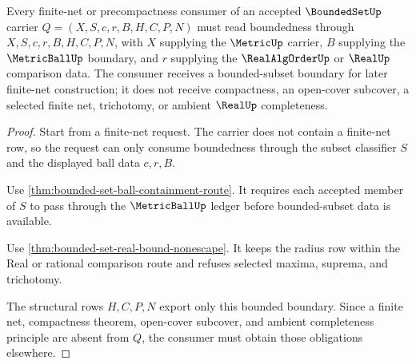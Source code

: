 \begin{theorem}
\label{thm:bounded-set-finite-net-consumer-boundary}
Every finite-net or precompactness consumer of an accepted $\BoundedSetUp$ carrier $Q=(X,S,c,r,B,H,C,P,N)$ must read boundedness through $X,S,c,r,B,H,C,P,N$, with $X$ supplying the $\MetricUp$ carrier, $B$ supplying the $\MetricBallUp$ boundary, and $r$ supplying the $\RealAlgOrderUp$ or $\RealUp$ comparison data. The consumer receives a bounded-subset boundary for later finite-net construction; it does not receive compactness, an open-cover subcover, a selected finite net, trichotomy, or ambient $\RealUp$ completeness.
\end{theorem}
\begin{proof}
Start from a finite-net request. The carrier does not contain a finite-net row, so the request can only consume boundedness through the subset classifier $S$ and the displayed ball data $c,r,B$.

Use \autoref{thm:bounded-set-ball-containment-route}. It requires each accepted member of $S$ to pass through the $\MetricBallUp$ ledger before bounded-subset data is available.

Use \autoref{thm:bounded-set-real-bound-nonescape}. It keeps the radius row within the Real or rational comparison route and refuses selected maxima, suprema, and trichotomy.

The structural rows $H,C,P,N$ export only this bounded boundary. Since a finite net, compactness theorem, open-cover subcover, and ambient completeness principle are absent from $Q$, the consumer must obtain those obligations elsewhere.
\end{proof}

